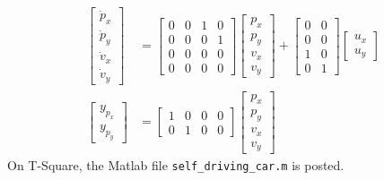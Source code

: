 \begin{align}
  \begin{bmatrix}
    \dot p_x \\ \dot p_y \\ \dot v_x \\ \dot v_y
  \end{bmatrix} &= \begin{bmatrix}
    0 & 0 & 1 & 0 \\
    0 & 0 & 0 & 1 \\
    0 & 0 & 0 & 0 \\
    0 & 0 & 0 & 0
  \end{bmatrix} \begin{bmatrix}
    p_x \\ p_y \\ v_x \\ v_y
  \end{bmatrix} + \begin{bmatrix}
    0 & 0 \\
    0 & 0 \\
    1 & 0 \\
    0 & 1
  \end{bmatrix} \begin{bmatrix}
    u_x \\ u_y
  \end{bmatrix} \\
  \begin{bmatrix}
    y_{p_x} \\ y_{p_y}
  \end{bmatrix} &= \begin{bmatrix}
    1 & 0 & 0 & 0 \\
    0 & 1 & 0 & 0
  \end{bmatrix} \begin{bmatrix}
    p_x \\ p_y \\ v_x \\ v_y
  \end{bmatrix}
\end{align}
On T-Square, the Matlab file \texttt{self\_driving\_car.m} is posted.

